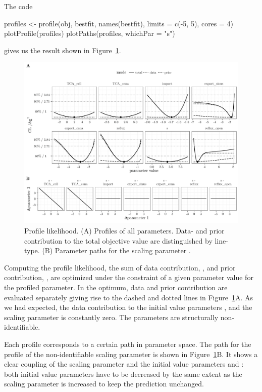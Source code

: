 \documentclass[article]{jss}
\begin{document}
The code
\begin{CodeChunk}
\begin{CodeInput}
profiles <- profile(obj, bestfit, names(bestfit), 
		    limits = c(-5, 5), cores = 4)
plotProfile(profiles)
plotPaths(profiles, whichPar = "s")
\end{CodeInput}
\end{CodeChunk}
gives us the result shown in Figure~\ref{fig:pl}.
\begin{figure}[ht]
	\centering
	\includegraphics[width = \textwidth]{images/figure7}
	\caption{Profile likelihood. (A) Profiles of all parameters. Data- and prior contribution to the total objective value are distinguished by line-type. (B) Parameter paths for the scaling parameter .}
	\label{fig:pl}
\end{figure}
Computing the profile likelihood, the sum of data contribution, , and prior contribution, , are optimized under the constraint of a given parameter value for the profiled parameter. In the optimum, data and prior contribution are evaluated separately giving rise to the dashed and dotted lines in Figure~\ref{fig:pl}A. As we had expected, the data contribution to the initial value parameters ,  and the scaling parameter  is constantly zero. The parameters are structurally non-identifiable.

Each profile corresponds to a certain path in parameter space. The path for the profile of the non-identifiable scaling parameter  is shown in Figure~\ref{fig:pl}B. It shows a clear coupling of the scaling parameter  and the initial value parameters  and : both initial value parameters have to be decreased by the same extent as the scaling parameter is increased to keep the prediction unchanged.
\end{document}
